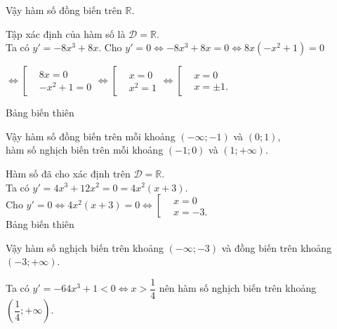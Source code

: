 \begin{vd}
{\begin{enumEX}[a)]{1}
\begin{center}
\begin{tikzpicture}
			\end{tikzpicture}
		\end{center}
		Vậy hàm số đồng biến trên $\mathbb{R}$.
		\item Tập xác định của hàm số là $ \mathscr{D}=\mathbb{R}$.\\
		Ta có $y'=-8x^3+8x$.
		Cho $y'=0 \Leftrightarrow -8x^3+8x=0 \Leftrightarrow 8x(-x^2+1)=0$\\
		\centerline{$ \Leftrightarrow \left[\begin{aligned}
				&8x=0 \\
				&-x^2+1=0
			\end{aligned}\right. \Leftrightarrow \left[\begin{aligned}
				&x=0 \\
				&x^2=1
			\end{aligned}\right. \Leftrightarrow \left[\begin{aligned}
				&x=0 \\
				&x=\pm 1.
			\end{aligned}\right. $}
		Bảng biến thiên
		\begin{center}
		\end{center}
		Vậy hàm số đồng biến trên mỗi khoảng $(-\infty;-1)$ và $(0;1)$,\\
		\indent{ } hàm số nghịch biến trên mỗi khoảng $(-1;0)$ và $(1;+\infty)$.
		\item Hàm số đã cho xác định trên $\mathscr{D}=\mathbb{R}$.\\
		Ta có $y'=4x^3+12x^2=0=4x^2(x+3)$.\\
		Cho $y'=0 \Leftrightarrow 4x^2(x+3)=0 \Leftrightarrow \left[\begin{aligned}
			&x=0 \\
			&x=-3.
		\end{aligned}\right.$\\
		Bảng biến thiên
		\begin{center}
		\end{center}
		Vậy hàm số nghịch biến trên khoảng $(-\infty;-3)$ và đồng biến trên khoảng $(-3;+\infty)$.
		\item Ta có $y'=-64x^3+1<0\Leftrightarrow x>\dfrac{1}{4}$ nên hàm số nghịch biến trên khoảng $\left(\dfrac{1}{4};+\infty\right)$.
\end{enumEX}}
\end{vd}
